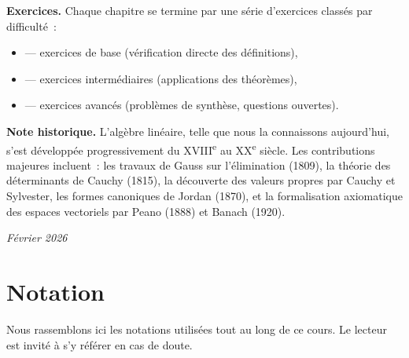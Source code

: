 \documentclass[a4paper,11pt,twoside,openright]{book}
\begin{document}
\medskip

\noindent\textbf{Exercices.}
Chaque chapitre se termine par une série d'exercices classés par difficulté~:
\begin{itemize}
  \item \basic{} --- exercices de base (vérification directe des définitions),
  \item \intermediate{} --- exercices intermédiaires (applications des théorèmes),
  \item \challenging{} --- exercices avancés (problèmes de synthèse, questions ouvertes).
\end{itemize}

\medskip

\noindent\textbf{Note historique.}
L'algèbre linéaire, telle que nous la connaissons aujourd'hui, s'est développée progressivement du XVIII\textsuperscript{e} au XX\textsuperscript{e} siècle. Les contributions majeures incluent~: les travaux de Gauss sur l'élimination (1809), la théorie des déterminants de Cauchy (1815), la découverte des valeurs propres par Cauchy et Sylvester, les formes canoniques de Jordan (1870), et la formalisation axiomatique des espaces vectoriels par Peano (1888) et Banach (1920).

\vfill
\begin{flushright}
\textit{Février 2026}
\end{flushright}

\chapter*{Notation}

Nous rassemblons ici les notations utilisées tout au long de ce cours. Le lecteur est invité à s'y référer en cas de doute.

\bigskip
\end{document}
